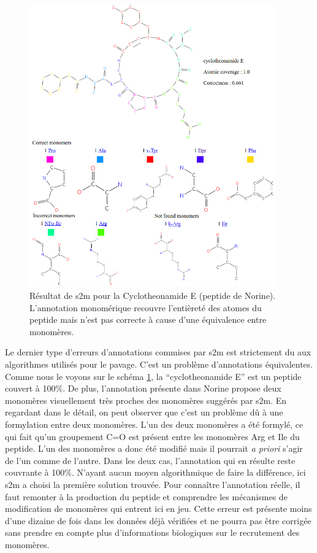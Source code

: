 \begin{figure}[h!]
  \begin{center}
    \includegraphics[width=400px]{Figures/s2m/results/cyclotheonamide.png}
    \caption{\label{cycloth}Résultat de s2m pour la Cyclotheonamide E (peptide de Norine).
    L'annotation monomérique recouvre l'entièreté des atomes du peptide mais n'est pas correcte à cause d'une équivalence entre monomères.}
  \end{center}
\end{figure}

Le dernier type d'erreurs d'annotations commises par s2m est strictement du aux algorithmes utilisés pour le pavage.
C'est un problème d'annotations équivalentes.
Comme nous le voyons sur le schéma \ref{cycloth}, la ``cyclotheonamide E'' est un peptide couvert à 100\%.
De plus, l'annotation présente dans Norine propose deux monomères visuellement très proches des monomères suggérés par s2m.
En regardant dans le détail, on peut observer que c'est un problème dû à une formylation entre deux monomères.
L'un des deux monomères a été formylé, ce qui fait qu'un groupement C=O est présent entre les monomères Arg et Ile du peptide.
L'un des monomères a donc été modifié mais il pourrait \textit{a priori} s'agir de l'un comme de l'autre.
Dans les deux cas, l'annotation qui en résulte reste couvrante à 100\%.
N'ayant aucun moyen algorithmique de faire la différence, ici s2m a choisi la première solution trouvée.
Pour connaître l'annotation réelle, il faut remonter à la production du peptide et comprendre les mécanismes de modification de monomères qui entrent ici en jeu.
Cette erreur est présente moins d'une dizaine de fois dans les données déjà vérifiées et ne pourra pas être corrigée sans prendre en compte plus d'informations biologiques sur le recrutement des monomères.


